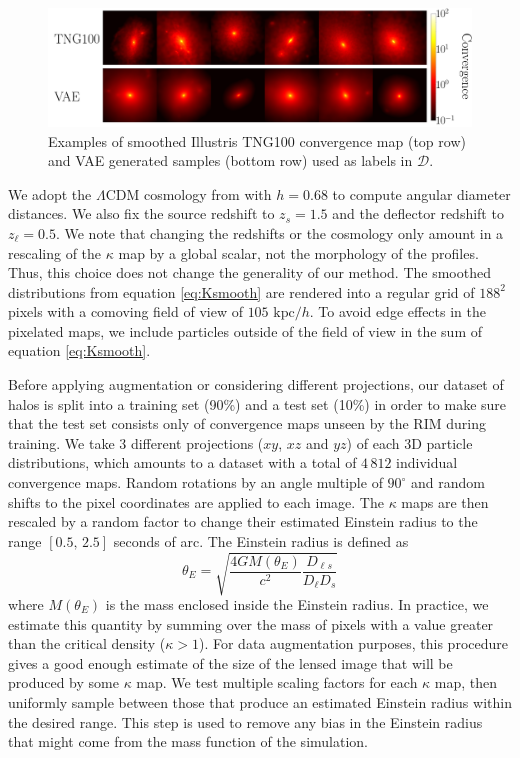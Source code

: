 \begin{figure}[t!]
        \centering
        \includegraphics[width=\linewidth]{figures/kap_vae_sample}
        \caption{Examples of smoothed Illustris TNG100 convergence map (top row) 
        and VAE generated samples (bottom row) used as labels in $\mathcal{D}$.}
        \label{fig:kappa}
\end{figure}

We adopt the $\Lambda$CDM cosmology from 
\citet{PlanckCollaboration2018} with $h=0.68$ to compute 
angular diameter distances. We also fix the 
source redshift to $z_s=1.5$ and the deflector redshift to $z_\ell=0.5$. 
We note that changing the redshifts or the cosmology 
only amount in a rescaling of the $\kappa$ map by a global scalar, not 
the morphology of the profiles. Thus, this choice does not change the generality of our method.
The smoothed distributions from equation \eqref{eq:Ksmooth} are 
rendered into a regular grid of $188^2$ pixels with a comoving field of view of $105\,\,\mathrm{kpc}/h$. 
To avoid 
edge effects in the pixelated maps, 
we include particles outside of the field of view in the sum of equation \eqref{eq:Ksmooth}.
\par
Before applying augmentation or considering different projections, our dataset of halos is split into a 
training set (90\%) and a test set (10\%) in order to make sure that the test set consists only 
of convergence maps unseen by the RIM during training.
We take 3 different projections ($xy$, $xz$ and $yz$) of each 3D particle 
distributions, which amounts to a dataset with a total of $4\,812$ individual convergence maps. 
Random rotations by an angle multiple of $90^{\circ}$ and random shifts to the pixel coordinates 
are applied to each image. The $\kappa$ maps are then rescaled by a random factor to change their 
estimated Einstein radius to the range 
$[0.5,\,2.5]$ seconds of arc.
The Einstein radius is defined as
\begin{equation}\label{eq:ThetaE}
        \theta_E = \sqrt{\frac{4GM(\theta_E)}{c^ 2} \frac{D_{\ell s}}{D_\ell D_s}}
\end{equation} 
where $M(\theta_E)$ is the mass enclosed inside the Einstein radius. In practice, we estimate this quantity 
by summing over the mass of pixels with a value greater than the critical density ($\kappa > 1$). 
For data augmentation purposes, this procedure gives a good enough estimate of the 
size of the lensed image that will be produced by some $\kappa$ map. 
We test multiple scaling factors for each $\kappa$ map, then uniformly sample between those that produce an estimated 
Einstein radius within the 
desired range. This step is used to remove any bias in the Einstein radius that might come from the mass function 
of the simulation.

